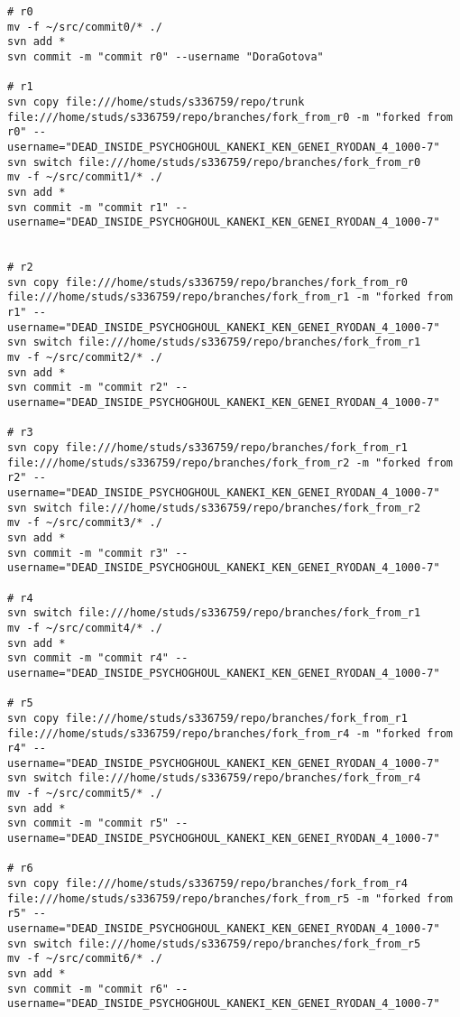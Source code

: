 
\tiny
\begin{verbatim}
# r0
mv -f ~/src/commit0/* ./
svn add *
svn commit -m "commit r0" --username "DoraGotova"

# r1
svn copy file:///home/studs/s336759/repo/trunk file:///home/studs/s336759/repo/branches/fork_from_r0 -m "forked from r0" --username="DEAD_INSIDE_PSYCHOGHOUL_KANEKI_KEN_GENEI_RYODAN_4_1000-7"
svn switch file:///home/studs/s336759/repo/branches/fork_from_r0
mv -f ~/src/commit1/* ./
svn add *
svn commit -m "commit r1" --username="DEAD_INSIDE_PSYCHOGHOUL_KANEKI_KEN_GENEI_RYODAN_4_1000-7"


# r2
svn copy file:///home/studs/s336759/repo/branches/fork_from_r0 file:///home/studs/s336759/repo/branches/fork_from_r1 -m "forked from r1" --username="DEAD_INSIDE_PSYCHOGHOUL_KANEKI_KEN_GENEI_RYODAN_4_1000-7"
svn switch file:///home/studs/s336759/repo/branches/fork_from_r1
mv -f ~/src/commit2/* ./
svn add *
svn commit -m "commit r2" --username="DEAD_INSIDE_PSYCHOGHOUL_KANEKI_KEN_GENEI_RYODAN_4_1000-7"

# r3
svn copy file:///home/studs/s336759/repo/branches/fork_from_r1 file:///home/studs/s336759/repo/branches/fork_from_r2 -m "forked from r2" --username="DEAD_INSIDE_PSYCHOGHOUL_KANEKI_KEN_GENEI_RYODAN_4_1000-7"
svn switch file:///home/studs/s336759/repo/branches/fork_from_r2
mv -f ~/src/commit3/* ./
svn add *
svn commit -m "commit r3" --username="DEAD_INSIDE_PSYCHOGHOUL_KANEKI_KEN_GENEI_RYODAN_4_1000-7"

# r4
svn switch file:///home/studs/s336759/repo/branches/fork_from_r1
mv -f ~/src/commit4/* ./
svn add *
svn commit -m "commit r4" --username="DEAD_INSIDE_PSYCHOGHOUL_KANEKI_KEN_GENEI_RYODAN_4_1000-7"

# r5
svn copy file:///home/studs/s336759/repo/branches/fork_from_r1 file:///home/studs/s336759/repo/branches/fork_from_r4 -m "forked from r4" --username="DEAD_INSIDE_PSYCHOGHOUL_KANEKI_KEN_GENEI_RYODAN_4_1000-7"
svn switch file:///home/studs/s336759/repo/branches/fork_from_r4
mv -f ~/src/commit5/* ./
svn add *
svn commit -m "commit r5" --username="DEAD_INSIDE_PSYCHOGHOUL_KANEKI_KEN_GENEI_RYODAN_4_1000-7"

# r6
svn copy file:///home/studs/s336759/repo/branches/fork_from_r4 file:///home/studs/s336759/repo/branches/fork_from_r5 -m "forked from r5" --username="DEAD_INSIDE_PSYCHOGHOUL_KANEKI_KEN_GENEI_RYODAN_4_1000-7"
svn switch file:///home/studs/s336759/repo/branches/fork_from_r5
mv -f ~/src/commit6/* ./
svn add *
svn commit -m "commit r6" --username="DEAD_INSIDE_PSYCHOGHOUL_KANEKI_KEN_GENEI_RYODAN_4_1000-7"


\end{verbatim}
